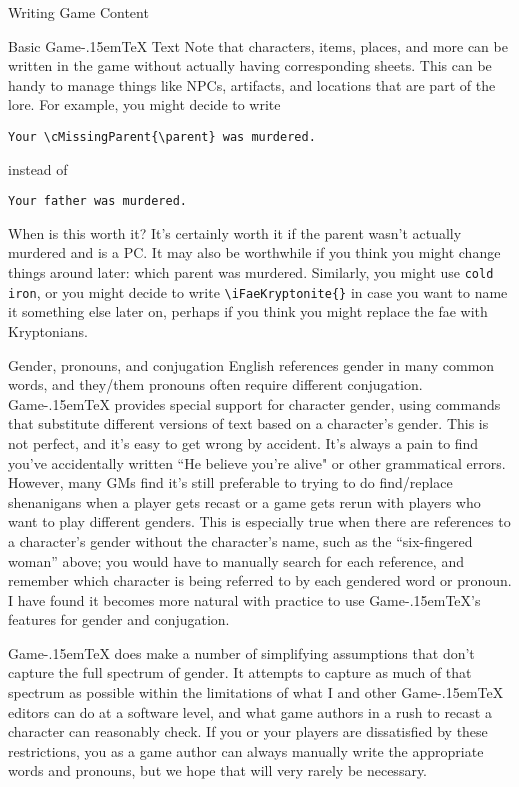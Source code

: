 \documentclass[11pt]{article}
\def\gametex{\mbox{Game\kern-.15em\TeX}}
\begin{document}
\begin{section}{Writing Game Content}
\begin{subsection}{Basic \gametex{} Text}
Note that characters, items, places, and more can be written in the game without actually having corresponding sheets.  This can be handy to manage things like NPCs, artifacts, and locations that are part of the lore.  For example, you might decide to write 
\begin{verbatim}
Your \cMissingParent{\parent} was murdered.
\end{verbatim}
instead of 
\begin{verbatim}
Your father was murdered.
\end{verbatim}

When is this worth it?  It's certainly worth it if the parent wasn't actually murdered and is a PC.  It may also be worthwhile if you think you might change things around later: which parent was murdered.  Similarly, you might use \lstinline|cold iron|, or you might decide to write \lstinline|\iFaeKryptonite{}| in case you want to name it something else later on, perhaps if you think you might replace the fae with Kryptonians.
\end{subsection}
\begin{subsection}{Gender, pronouns, and conjugation}
\label{gender}
English references gender in many common words, and they/them pronouns often require different conjugation.  \gametex{} provides special support for character gender, using commands that substitute different versions of text based on a character's gender.  This is not perfect, and it's easy to get wrong by accident.  It's always a pain to find you've accidentally written ``He believe you're alive" or other grammatical errors.  However, many GMs find it's still preferable to trying to do find/replace shenanigans when a player gets recast or a game gets rerun with players who want to play different genders.  This is especially true when there are references to a character's gender without the character's name, such as the ``six-fingered woman'' above; you would have to manually search for each reference, and remember which character is being referred to by each gendered word or pronoun.  I have found it becomes more natural with practice to use \gametex{}'s features for gender and conjugation.

\gametex{} does make a number of simplifying assumptions that don't capture the full spectrum of gender.  It attempts to capture as much of that spectrum as possible within the limitations of what I and other \gametex{} editors can do at a software level, and what game authors in a rush to recast a character can reasonably check.  If you or your players are dissatisfied by these restrictions, you as a game author can always manually write the appropriate words and pronouns, but we hope that will very rarely be necessary.


\end{subsection}
\end{section}
\end{document}
